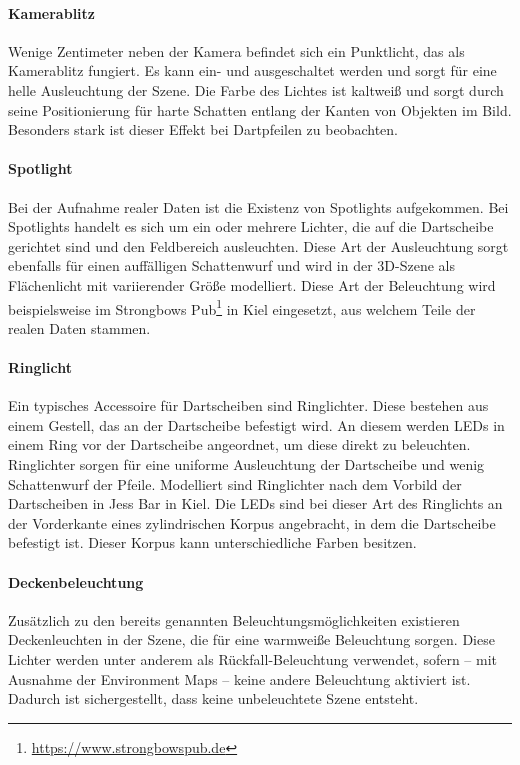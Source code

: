 \paragraph{Kamerablitz}

Wenige Zentimeter neben der Kamera befindet sich ein Punktlicht, das als Kamerablitz fungiert. Es kann ein- und ausgeschaltet werden und sorgt für eine helle Ausleuchtung der Szene. Die Farbe des Lichtes ist kaltweiß und sorgt durch seine Positionierung für harte Schatten entlang der Kanten von Objekten im Bild. Besonders stark ist dieser Effekt bei Dartpfeilen zu beobachten.

\newpage
\paragraph{Spotlight}

Bei der Aufnahme realer Daten ist die Existenz von Spotlights aufgekommen. Bei Spotlights handelt es sich um ein oder mehrere Lichter, die auf die Dartscheibe gerichtet sind und den Feldbereich ausleuchten. Diese Art der Ausleuchtung sorgt ebenfalls für einen auffälligen Schattenwurf und wird in der 3D-Szene als Flächenlicht mit variierender Größe modelliert. Diese Art der Beleuchtung wird beispielsweise im Strongbows Pub\footnote{\url{https://www.strongbowspub.de}} in Kiel eingesetzt, aus welchem Teile der realen Daten stammen.

\paragraph{Ringlicht}

Ein typisches Accessoire für Dartscheiben sind Ringlichter. Diese bestehen aus einem Gestell, das an der Dartscheibe befestigt wird. An diesem werden LEDs in einem Ring vor der Dartscheibe angeordnet, um diese direkt zu beleuchten. Ringlichter sorgen für eine uniforme Ausleuchtung der Dartscheibe und wenig Schattenwurf der Pfeile. Modelliert sind Ringlichter nach dem Vorbild der Dartscheiben in Jess Bar in Kiel. Die LEDs sind bei dieser Art des Ringlichts an der Vorderkante eines zylindrischen Korpus angebracht, in dem die Dartscheibe befestigt ist. Dieser Korpus kann unterschiedliche Farben besitzen.

\paragraph{Deckenbeleuchtung}

Zusätzlich zu den bereits genannten Beleuchtungsmöglichkeiten existieren Deckenleuchten in der Szene, die für eine warmweiße Beleuchtung sorgen. Diese Lichter werden unter anderem als Rückfall-Beleuchtung verwendet, sofern -- mit Ausnahme der Environment Maps -- keine andere Beleuchtung aktiviert ist. Dadurch ist sichergestellt, dass keine unbeleuchtete Szene entsteht.

